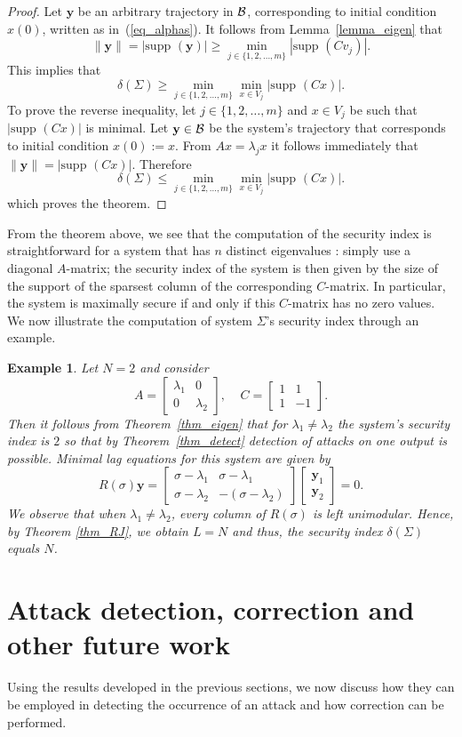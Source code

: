 \documentclass[letterpaper, 10 pt, conference]{ieeeconf}
\newcommand{\B}{{\cal B}}
\newcommand{\supp}{\mbox{supp }}
\newcommand{\ybold}{\mathbf{y}}
\newcommand{\bmat}{\left[ \begin{array}}
\newcommand{\emat}{\end{array} \right]}
\newtheorem{example}[thm]{Example}
\begin{document}
\begin{proof}
Let $\ybold$ be an arbitrary trajectory in $\B$, corresponding to initial condition $x(0)$, written as in~(\ref{eq_alphas}). It follows from Lemma~\ref{lemma_eigen} that 
\[
\|\ybold \|= |\supp ( \ybold ) | \geq \min_{j \in \{1,2,\ldots , m\}} |\supp (Cv_j )| . 
\]
This implies that
\[
\delta (\Sigma ) \geq \min_{j \in \{1,2,\ldots , m\}} \min_{x\in V_j} |\supp(Cx) |.
\]
		To prove the reverse inequality, let $j \in \{1,2,\ldots , m\}$ and $x \in V_j$ be such that $|\supp(Cx)|$ is minimal. Let $\ybold \in \B$ be the system's trajectory that corresponds to initial condition $x(0) := x$. From $Ax = \lambda_j x$ it follows immediately that $\|\ybold \|= |\supp(Cx)|$. Therefore 
		\[
		\delta (\Sigma ) \leq \min_{j \in \{1,2,\ldots , m\}} \min_{x\in V_j} |\supp(Cx) | . 
		\]
		which proves the theorem.
\end{proof}
From the theorem above, we see that the computation of the security index is straightforward for a system that has $n$ distinct eigenvalues : simply use a diagonal $A$-matrix; the security index of the system is then given by the size of the support of the sparsest column of the corresponding $C$-matrix.  In particular, the system is maximally secure if and only if this $C$-matrix has no zero values. We now illustrate the computation of system $\Sigma$'s security index through an example. 
\begin{example}
Let $N=2$ and consider
\[
A= \bmat{cc} \lambda_1 & 0 \\ 0 & \lambda_2 \emat, \;\;\;\;C = \bmat{cc} 1 & 1 \\ 1 & -1 \emat .
\]
Then it follows from Theorem~\ref{thm_eigen} that for $\lambda_1 \neq \lambda_2$ the system's security index is $2$ so that by Theorem~\ref{thm_detect} detection of attacks on one output is possible. Minimal lag equations for this system are given by
\begin{equation}
	R(\sigma) \ybold = 
\bmat{cc} \sigma - \lambda_1 & \sigma - \lambda_1  \\  \sigma - \lambda_2 & -(\sigma - \lambda_2 ) \emat \bmat{c} \ybold_1 \\ \ybold_2 \emat = 0. \nonumber
\end{equation}
We observe that when $\lambda_{1}\neq \lambda_2$, every column of $R(\sigma)$ is left unimodular. Hence, by Theorem \ref{thm_RJ}, we obtain $L=N$ and thus, the security index $\delta(\Sigma)$ equals $N$.
\end{example}


\section{Attack detection, correction and other future work}
Using the results developed in the previous sections, we now discuss how they can be employed in detecting the occurrence of an attack and how correction can be performed.
\end{document}
